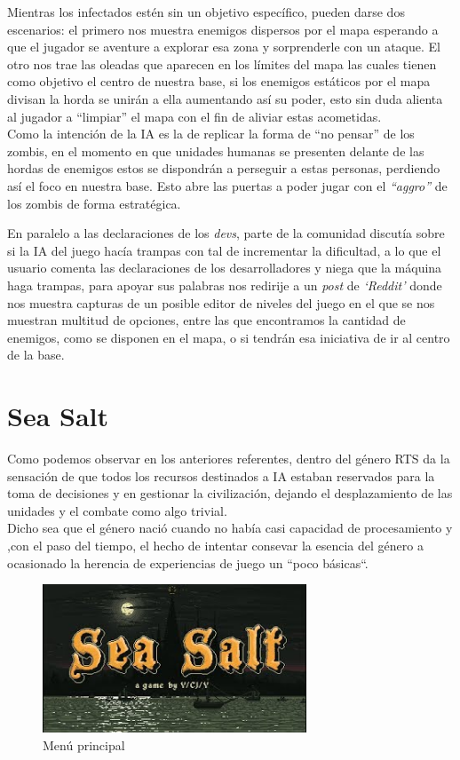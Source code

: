 Mientras los infectados estén sin un objetivo específico, pueden darse dos escenarios:
el primero nos muestra enemigos dispersos por el mapa esperando a que el jugador se aventure
a explorar esa zona y sorprenderle con un ataque. El otro nos trae las oleadas que aparecen
en los límites del mapa las cuales tienen como objetivo el centro de nuestra base, si los
enemigos estáticos por el mapa divisan la horda se unirán a ella aumentando así su poder, esto
sin duda alienta al jugador a ``limpiar'' el mapa con el fin de aliviar estas acometidas.\\
Como la intención de la \ac{IA} es la de replicar la forma de ``no pensar'' de los zombis, en
el momento en que unidades humanas se presenten delante de las hordas de enemigos estos se
dispondrán a perseguir a estas personas, perdiendo así el foco en nuestra base. Esto abre las
puertas a poder jugar con el \textit{``aggro''} de los zombis de forma estratégica.

En paralelo a las declaraciones de los \textit{devs}, parte de la comunidad discutía sobre si
la \ac{IA} del juego hacía trampas con tal de incrementar la dificultad, a lo que el usuario
\citeauthor*{Steam_User2019} comenta las declaraciones de los desarrolladores y niega que la
máquina haga trampas, para apoyar sus palabras nos redirije a un \textit{post} de \textit{`Reddit'}
donde \citeauthor*{Pikachunet2018} nos muestra capturas de un posible editor de niveles del
juego en el que se nos muestran multitud de opciones, entre las que encontramos la cantidad de
enemigos, como se disponen en el mapa, o si tendrán esa iniciativa de ir al centro de la base.


\section{Sea Salt}
Como podemos observar en los anteriores referentes, dentro del género \ac{RTS} da la sensación
de que todos los recursos destinados a \ac{IA} estaban reservados para la toma de decisiones y 
en gestionar la civilización, dejando el desplazamiento de las unidades y el combate como algo
trivial. \\
Dicho sea que el género nació cuando no había casi capacidad de procesamiento
y ,con el paso del tiempo, el hecho de intentar consevar la esencia del género a ocasionado la
herencia de experiencias de juego un ``poco básicas``.

\begin{figure}[ht]
\centering
\includegraphics[width=0.7\textwidth]{imagenes/marco_teo/referentes/ss_1.png}
\caption{Menú principal}
\label{img:ss_1}
\end{figure}

